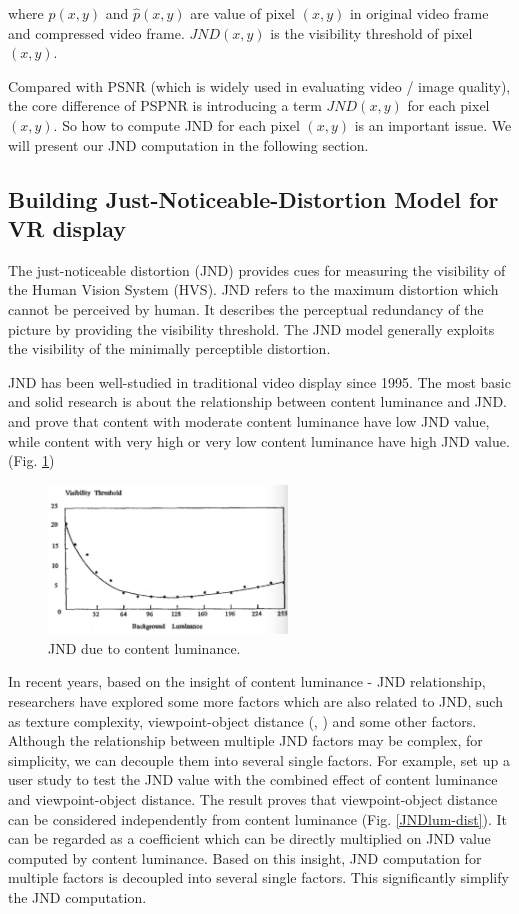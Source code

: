 where $p(x, y)$ and $\hat{p}(x, y)$ are value of pixel $(x, y)$ in original video frame and compressed video frame. $JND(x, y)$ is the visibility threshold of pixel $(x, y)$.

Compared with PSNR (which is widely used in evaluating video / image quality), the core difference of PSPNR is introducing a term $JND(x, y)$ for each pixel $(x, y)$. So how to compute JND for each pixel $(x, y)$ is an important issue. We will present our JND computation in the following section.

\subsection{Building Just-Noticeable-Distortion Model for VR display}
The just-noticeable distortion (JND) provides cues for measuring the visibility of the Human Vision System (HVS). JND refers to the maximum distortion which cannot be perceived by human. It describes the perceptual redundancy of the picture by providing the visibility threshold. The JND model generally exploits the visibility of the minimally perceptible distortion.

JND has been well-studied in traditional video display since 1995. The most basic and solid research is about the relationship between content luminance and JND. \cite{luminance1}  and \cite{PSPNR} prove that content with moderate content luminance have low JND value, while content with very high or very low content luminance have high JND value. (Fig. \ref{JNDluminance})

\begin{figure}
  \centering
  \includegraphics[width=2.5in]{images/backgroundluminance.jpg}
  \caption{JND due to content luminance.}
  \label{JNDluminance}
  \end{figure}

In recent years, based on the insight of content luminance - JND relationship, researchers have explored some more factors which are also related to JND, such as texture complexity, viewpoint-object distance (\cite{PSPNR}, \cite{distance}) and some other factors. Although the relationship between multiple JND factors may be complex, for simplicity, we can decouple them into several single factors. For example, \cite{distance} set up a user study to test the JND value with the combined effect of content luminance and viewpoint-object distance. The result proves that viewpoint-object distance can be considered independently from content luminance (Fig. \ref{JNDlum-dist}). It can be regarded as a coefficient which can be directly multiplied on JND value computed by content luminance. Based on this insight, JND computation for multiple factors is decoupled into several single factors. This significantly simplify the JND computation.

